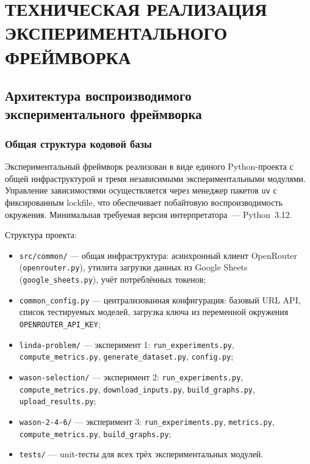\chapter{ТЕХНИЧЕСКАЯ РЕАЛИЗАЦИЯ ЭКСПЕРИМЕНТАЛЬНОГО ФРЕЙМВОРКА}

\section{Архитектура воспроизводимого экспериментального фреймворка}

\subsection{Общая структура кодовой базы}

Экспериментальный фреймворк реализован в виде единого Python-проекта с общей инфраструктурой и тремя независимыми экспериментальными модулями. Управление зависимостями осуществляется через менеджер пакетов \texttt{uv} с фиксированным lockfile, что обеспечивает побайтовую воспроизводимость окружения. Минимальная требуемая версия интерпретатора~--- Python~3.12.

Структура проекта:
\begin{itemize}
  \item \texttt{src/common/} --- общая инфраструктура: асинхронный клиент OpenRouter (\texttt{openrouter.py}), утилита загрузки данных из Google Sheets (\texttt{google\_sheets.py}), учёт потреблённых токенов;
  \item \texttt{common\_config.py} --- централизованная конфигурация: базовый URL API, список тестируемых моделей, загрузка ключа из переменной окружения \texttt{OPENROUTER\_API\_KEY};
  \item \texttt{linda-problem/} --- эксперимент 1: \texttt{run\_experiments.py}, \texttt{compute\_metrics.py}, \texttt{generate\_dataset.py}, \texttt{config.py};
  \item \texttt{wason-selection/} --- эксперимент 2: \texttt{run\_experiments.py}, \texttt{compute\_metrics.py}, \texttt{download\_inputs.py}, \texttt{build\_graphs.py}, \texttt{upload\_results.py};
  \item \texttt{wason-2-4-6/} --- эксперимент 3: \texttt{run\_experiments.py}, \texttt{metrics.py}, \texttt{compute\_metrics.py}, \texttt{build\_graphs.py};
  \item \texttt{tests/} --- unit-тесты для всех трёх экспериментальных модулей.
\end{itemize}

